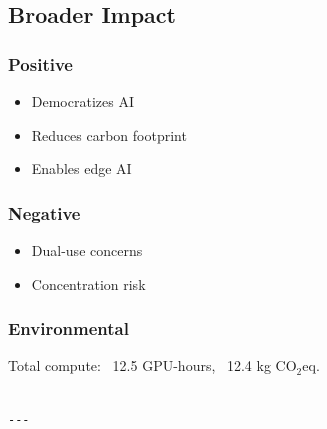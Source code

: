 \subsection{Broader Impact}

\subsubsection{Positive}
\begin{itemize}
\item Democratizes AI
\item Reduces carbon footprint
\item Enables edge AI

\end{itemize}
\subsubsection{Negative}
\begin{itemize}
\item Dual-use concerns
\item Concentration risk

\end{itemize}
\subsubsection{Environmental}
Total compute: ~12.5 GPU-hours, ~12.4 kg CO$_2$eq.
\begin{lstlisting}

---
\end{lstlisting}